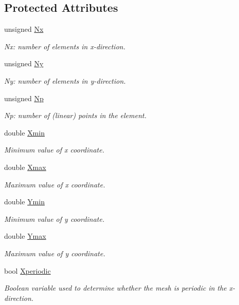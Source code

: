\subsection*{Protected Attributes}
\begin{DoxyCompactItemize}
\item 
unsigned \hyperlink{classoomph_1_1RectangularQuadMesh_a1b2c0a2d1f8399713033953c72d399ee}{Nx}
\begin{DoxyCompactList}\small\item\em Nx\+: number of elements in x-\/direction. \end{DoxyCompactList}\item 
unsigned \hyperlink{classoomph_1_1RectangularQuadMesh_a49a5ee7ef86ce837fb807eb6014a296d}{Ny}
\begin{DoxyCompactList}\small\item\em Ny\+: number of elements in y-\/direction. \end{DoxyCompactList}\item 
unsigned \hyperlink{classoomph_1_1RectangularQuadMesh_a92502c7536a6644ebffd806841cd4d98}{Np}
\begin{DoxyCompactList}\small\item\em Np\+: number of (linear) points in the element. \end{DoxyCompactList}\item 
double \hyperlink{classoomph_1_1RectangularQuadMesh_af3aab508d077460545031e758396514a}{Xmin}
\begin{DoxyCompactList}\small\item\em Minimum value of x coordinate. \end{DoxyCompactList}\item 
double \hyperlink{classoomph_1_1RectangularQuadMesh_ab8e4ddba0ce8315cf480cdd1f3447684}{Xmax}
\begin{DoxyCompactList}\small\item\em Maximum value of x coordinate. \end{DoxyCompactList}\item 
double \hyperlink{classoomph_1_1RectangularQuadMesh_ade53fec7446044418ccba9f55d692adb}{Ymin}
\begin{DoxyCompactList}\small\item\em Minimum value of y coordinate. \end{DoxyCompactList}\item 
double \hyperlink{classoomph_1_1RectangularQuadMesh_aacbacc3a0e6ea8508abb3140ba343ffa}{Ymax}
\begin{DoxyCompactList}\small\item\em Maximum value of y coordinate. \end{DoxyCompactList}\item 
bool \hyperlink{classoomph_1_1RectangularQuadMesh_a83dd0ace2eb47449f5e30522f71d9f59}{Xperiodic}
\begin{DoxyCompactList}\small\item\em Boolean variable used to determine whether the mesh is periodic in the x-\/direction. \end{DoxyCompactList}\end{DoxyCompactItemize}
